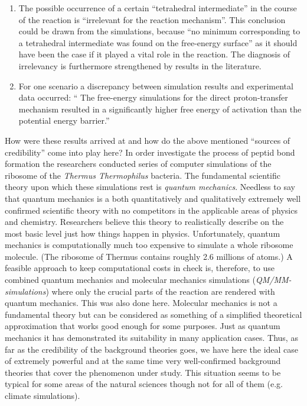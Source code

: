 \documentclass[onecollarge]{STJour}
\numberwithin{equation}{section}
\begin{document}
\begin{enumerate}
\item The possible occurrence of a certain ``tetrahedral intermediate''
in the course of the reaction is ``irrelevant for the reaction
mechanism''. This conclusion could be drawn from the simulations, because
``no minimum corresponding to a tetrahedral intermediate was found on the
free-energy surface'' as it should have been the case if it played a
vital role in the reaction. The diagnosis of irrelevancy is furthermore
strengthened by results in the literature. \citep[p.\ 300]{kaestner-sherwood:2010}

\item For one scenario a discrepancy between simulation results and
experimental data occurred: `` The free-energy simulations for the
direct proton-transfer mechanism resulted in a significantly
higher free energy of activation than the potential
energy barrier.'' \citep[p.\ 304]{kaestner-sherwood:2010} 

\end{enumerate}

How were these results arrived at and how do the above mentioned
``sources of credibility'' come into play here? In order investigate the
process of peptid bond formation the researchers conducted series of
computer simulations of the ribosome of the {\em Thermus Thermophilus}
bacteria. The fundamental scientific theory upon which these simulations
rest is {\em quantum mechanics}. Needless to say that quantum mechanics
is a both quantitatively and qualitatively extremely well confirmed
scientific theory with no competitors in the applicable areas of physics
and chemistry. Researchers believe this theory to realistically describe
on the most basic level just how things happen in physics.
Unfortunately, quantum mechanics is computationally much too expensive
to simulate a whole ribosome molecule. (The ribosome of Thermus contains
roughly 2.6 millions of atoms.) A feasible approach to keep
computational costs in check is, therefore, to use combined quantum
mechanics and molecular mechanics simulations ({\em QM/MM-simulations})
where only the crucial parts of the reaction are rendered with quantum
mechanics. This was also done here. Molecular mechanics is not a
fundamental theory but can be considered as something of a simplified
theoretical approximation that works good enough for some purposes. Just
as quantum mechanics it has demonstrated its suitability in many
application cases. Thus, as far as the credibility of the background
theories goes, we have here the ideal case of extremely powerful and at
the same time very well-confirmed background theories that cover the
phenomenon under study. This situation seems to be typical for some
areas of the natural sciences though not for all of them (e.g. climate
simulations).
\end{document}
